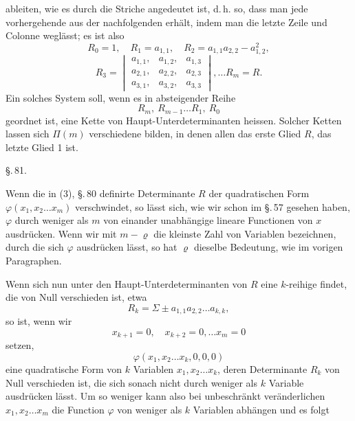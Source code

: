 ableiten, wie es durch die Striche angedeutet ist, d.\,h. so, dass
man jede vorhergehende aus der nachfolgenden erhält, indem
man die letzte Zeile und Colonne weglässt; es ist also
\[
R_0 = 1, \quad R_1 = a_{1,1}, \quad R_2 = a_{1,1}a_{2,2} - a_{1,2}^2,
\]
\[
R_3 = \begin{vmatrix} a_{1,1}, & a_{1,2}, & a_{1,3} \\ a_{2,1}, & a_{2,2}, & a_{2,3} \\ a_{3,1}, & a_{3,2}, & a_{3,3} \end{vmatrix}, \ldots R_m = R.
\]
Ein solches System soll, wenn es in absteigender Reihe
\[
R_m,\ R_{m-1} \ldots R_1,\ R_0
\]
geordnet ist, eine Kette von Haupt-Unterdeterminanten heissen.
Solcher Ketten lassen sich $\Pi(m)$ verschiedene bilden, in denen
allen das erste Glied $R$, das letzte Glied 1 ist.

\begin{center}
\S.\,81.

\end{center}

Wenn die in (3), \S.\,80 definirte Determinante $R$ der quadra\-tischen
Form $\varphi(x_1, x_2 \ldots x_m)$ verschwindet, so lässt sich, wie wir
schon im \S.\,57 gesehen haben, $\varphi$ durch weniger als $m$ von ein\-ander
unabhängige lineare Functionen von $x$ ausdrücken. Wenn
wir mit $m - \varrho$ die kleinste Zahl von Variablen bezeichnen, durch
die sich $\varphi$ ausdrücken lässt, so hat $\varrho$ dieselbe Bedeutung, wie
im vorigen Paragraphen.

Wenn sich nun unter den Haupt-Unterdeterminanten von $R$
eine $k$-reihige findet, die von Null verschieden ist, etwa
\[
R_k = \Sigma \pm a_{1,1}a_{2,2} \ldots a_{k,k},
\]
so ist, wenn wir
\[
x_{k+1} = 0,\quad x_{k+2} = 0, \ldots x_m = 0
\]
setzen,
\[
\varphi(x_1, x_2 \ldots x_k, 0, 0, 0)
\]
eine quadratische Form von $k$ Variablen $x_1, x_2 \ldots x_k$, deren
Determinante $R_k$ von Null verschieden ist, die sich sonach nicht
durch weniger als $k$ Variable ausdrücken lässt. Um so weniger
kann also bei unbeschränkt veränderlichen $x_1, x_2 \ldots x_m$ die
Function $\varphi$ von weniger als $k$ Variablen abhängen und es folgt
